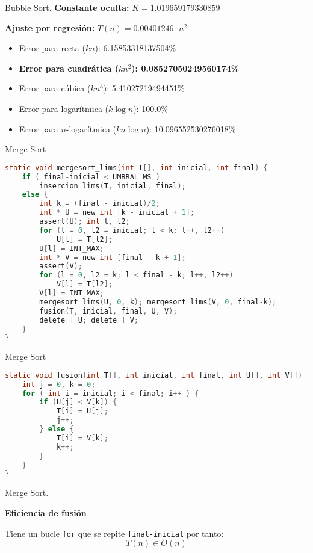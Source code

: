 \documentclass[10pt, xcolor=table]{beamer}
\begin{document}
\begin{frame}[fragile]{Bubble Sort. 
	}
\textbf{Constante oculta:} $K=1.019659179330859$

\textbf{Ajuste por regresión:} $T(n)=0.00401246\cdot n^2$
\begin{itemize}
	\item Error para recta ($kn$): 6.15853318137504\%
	\item \textbf{Error para cuadrática ($kn^2$): 0.08527050249560174\%}
	\item Error para cúbica ($kn^3$): 5.41027219494451\%
	\item Error para logarítmica ($k\log n$): 100.0\%
	\item Error para $n$-logarítmica ($kn\log n$): 10.096552530276018\%
\end{itemize}
\end{frame}

\begin{frame}[fragile]{Merge Sort}
\begin{lstlisting}[language=C]
static void mergesort_lims(int T[], int inicial, int final) {
	if ( final-inicial < UMBRAL_MS ) 
		insercion_lims(T, inicial, final);
	else {
		int k = (final - inicial)/2;
		int * U = new int [k - inicial + 1];
		assert(U); int l, l2;
		for (l = 0, l2 = inicial; l < k; l++, l2++)
			U[l] = T[l2];
		U[l] = INT_MAX;
		int * V = new int [final - k + 1];
		assert(V);
		for (l = 0, l2 = k; l < final - k; l++, l2++) 
			V[l] = T[l2];
		V[l] = INT_MAX;
		mergesort_lims(U, 0, k); mergesort_lims(V, 0, final-k);
		fusion(T, inicial, final, U, V);
		delete[] U; delete[] V;
	}
}
\end{lstlisting}
\end{frame}

\begin{frame}[fragile]{Merge Sort}
\begin{lstlisting}[language=C]
static void fusion(int T[], int inicial, int final, int U[], int V[]) {
	int j = 0, k = 0;
	for ( int i = inicial; i < final; i++ ) {
		if (U[j] < V[k]) {
			T[i] = U[j];
			j++;
		} else {
			T[i] = V[k];
			k++;
		}
	}
}
\end{lstlisting}
\end{frame}
\begin{frame}[fragile]{Merge Sort. 
}
\begin{center}
\textbf{\large{Eficiencia de fusión}}
\end{center}
Tiene un bucle \texttt{for} que se repite \texttt{final-inicial} por tanto:$$T(n) \in O(n)$$
\end{frame}
\end{document}
